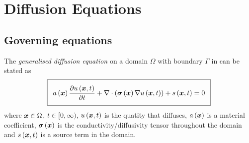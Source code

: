 \section{Diffusion Equations} 

\subsection{Governing equations}

The \emph{generalised diffusion equation} on a domain $\Omega$ with boundary
$\Gamma$ in \OpenCMISS can be stated as
\begin{equation}
  \addtolength{\fboxsep}{5pt}
  \boxed{
    \fnof{a}{\vectr{x}}\delby{\fnof{u}{\vectr{x},t}}{t}+
    \divergence{}{\pbrac{\fnof{\tensor{\sigma}}{\vectr{x}}\gradient{}{\fnof{u}{\vectr{x},t}}}}+
    \fnof{s}{\vectr{x},t}=0  
  }
  \label{eqn:diffusionequation}
\end{equation}
where $\boldsymbol{x}\in\Omega$, $t\in[0,\infty)$, $ u\left( \boldsymbol{x},t \right) $ is the quatity that diffuses,
$ a\left( \boldsymbol{x} \right) $ is a material coefficient, $ \boldsymbol{\mathit{\sigma}}\left( \boldsymbol{x} \right) $ is
the conductivity/diffusivity tensor throughout the domain and $ s\left( \boldsymbol{x},t \right) $ is a
source term in the domain.

